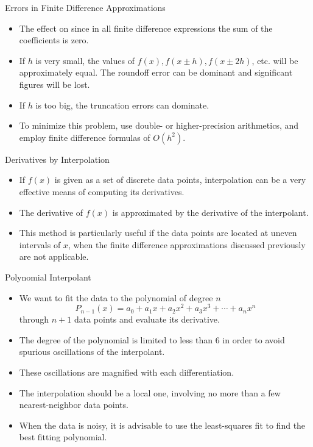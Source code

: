 \documentclass{beamer}
\begin{document}
\begin{frame}{Errors in Finite Difference Approximations}
\begin{itemize}
\item The effect on since  in all finite difference expressions the sum of the coefficients is zero.
\item If $h$ is very small,  the values of $f(x), f(x\pm h), f(x\pm 2h)$, etc. will be approximately equal. The \alert{roundoff error} can be dominant and significant figures will be lost.
\item If $h$ is too big, the \alert{truncation errors} can dominate.
\item To minimize this problem, use double- or higher-precision arithmetics, and  employ finite difference formulas of $O(h^2)$.
 \end{itemize}
\end{frame}
\begin{frame}{Derivatives by Interpolation}
\begin{itemize}
\item If $f(x)$ is given as a set of discrete data points, interpolation can be a very effective means of computing its derivatives. 
\item The derivative of $f(x)$ is approximated by the derivative of the interpolant. 
\item This method is particularly useful if the data points are located at \alert{uneven intervals} of $x$, when the finite difference approximations discussed previously  are not applicable.
\end{itemize}
\end{frame}
\begin{frame}{Polynomial Interpolant}
\begin{itemize}
\item We want to fit the data to the polynomial of degree $n$
\[
P_{n-1}(x)=a_0+a_1 x+ a_2 x^2+a_3 x^3+\cdots +a_nx^n
\]
through $n+1$ data points and evaluate its derivative.
\item The degree of the polynomial is limited to less than 6 in order to avoid spurious \alert{oscillations} of the interpolant. 
\item These oscillations are \alert{magnified} with each differentiation.
\item The interpolation should be a local one, involving no more than a few nearest-neighbor data points.
\item When the data is noisy, it is advisable to use the \alert{least-squares fit} to find the best fitting polynomial.  
\end{itemize}
\end{frame}
\end{document}
